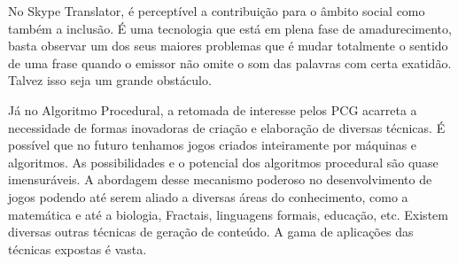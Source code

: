 \documentclass[12pt]{article}
\begin{document}
No Skype Translator, é perceptível a contribuição para o âmbito social como também a inclusão. É uma tecnologia que está em plena fase de amadurecimento, basta observar um dos seus maiores problemas que é mudar totalmente o sentido de uma frase quando o emissor não omite o som das palavras com certa exatidão. Talvez isso seja um grande obstáculo.

Já no Algoritmo Procedural, a retomada de interesse pelos PCG acarreta a necessidade de formas inovadoras de criação e elaboração de diversas técnicas. É possível que no futuro tenhamos jogos criados inteiramente por máquinas e algoritmos. As possibilidades e o potencial dos algoritmos procedural são quase imensuráveis.
A abordagem desse mecanismo poderoso no desenvolvimento de jogos podendo até serem aliado a diversas áreas do conhecimento, como a matemática e até a biologia, Fractais, linguagens formais, educação, etc. Existem diversas outras técnicas de geração de conteúdo. A gama de aplicações das técnicas expostas é vasta.   





\end{document}
